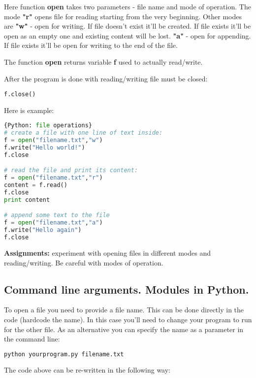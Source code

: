 Here function \textbf{open} takes two parameters - file name and mode of operation.
The mode \textbf{"r"} opens file for reading starting from the very beginning.
Other modes are
\textbf{"w"} - open for writing. If file doesn't exist it'll be created. If file
exists it'll be open as an empty one and existing content will be lost.
\textbf{"a"} - open for appending. If file exists it'll be open for writing
to the end of the file.

The function \textbf{open} returns variable \textbf{f} used to actually
read/write.

After the program is done with reading/writing file must be closed:

\bigskip
\lstinline{f.close()}
\bigskip

Here is example:

\begin{lstlisting}[language=Python,style=codelst]{Python: file operations}
# create a file with one line of text inside:
f = open("filename.txt","w")
f.write("Hello world!")
f.close

# read the file and print its content:
f = open("filename.txt","r")
content = f.read()
f.close
print content

# append some text to the file
f = open("filename.txt","a")
f.write("Hello again")
f.close
\end{lstlisting}

\begin{tcolorbox}
\textbf{Assignments:}
experiment with opening files in different modes
and reading/writing. Be careful with modes of operation.
\end{tcolorbox}

\subsection{Command line arguments. Modules in Python.}

To open a file you need to provide a file name. This can be done
directly in the code (hardcode the name). In this case you'll need to change
your program to run for the other file. As an alternative you can
specify the name as a parameter in the command line:

\begin{lstlisting}[language=bash,frame=single]
python yourprogram.py filename.txt
\end{lstlisting}

The code above can be re-written in the following way:

